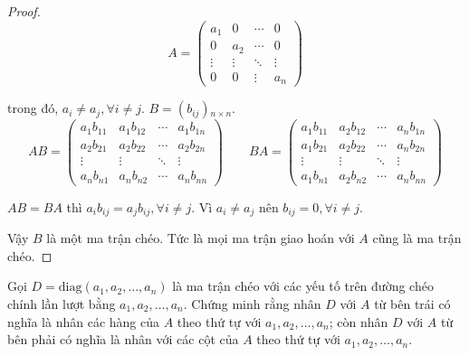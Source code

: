 \begin{proof}
    \[
        A =
        \begin{pmatrix}
            a_{1}  & 0      & \cdots & 0      \\
            0      & a_{2}  & \cdots & 0      \\
            \vdots & \vdots & \ddots & \vdots \\
            0      & 0      & \vdots & a_{n}
        \end{pmatrix}
    \]
    
    trong đó, $a_{i}\ne a_{j},\forall i\ne j$. $B = (b_{ij}){}_{n\times n}$.
    \[
        AB =
        \begin{pmatrix}
            a_{1}b_{11} & a_{1}b_{12} & \cdots & a_{1}b_{1n} \\
            a_{2}b_{21} & a_{2}b_{22} & \cdots & a_{2}b_{2n} \\
            \vdots      & \vdots      & \ddots & \vdots      \\
            a_{n}b_{n1} & a_{n}b_{n2} & \cdots & a_{n}b_{nn}
        \end{pmatrix}
        \qquad
        BA =
        \begin{pmatrix}
            a_{1}b_{11} & a_{2}b_{12} & \cdots & a_{n}b_{1n} \\
            a_{1}b_{21} & a_{2}b_{22} & \cdots & a_{n}b_{2n} \\
            \vdots      & \vdots      & \ddots & \vdots      \\
            a_{1}b_{n1} & a_{2}b_{n2} & \cdots & a_{n}b_{nn}
        \end{pmatrix}
    \]
    
    $AB = BA$ thì $a_{i}b_{ij} = a_{j}b_{ij},\forall i\ne j$. Vì $a_{i} \ne a_{j}$ nên $b_{ij} = 0,\forall i\ne j$.
    
    Vậy $B$ là một ma trận chéo. Tức là mọi ma trận giao hoán với $A$ cũng là ma trận chéo.
\end{proof}

\begin{exercise}
    Gọi $D = \text{diag}(a_{1},a_{2},\ldots,a_{n})$ là ma trận chéo với các yếu tố trên đường chéo chính lần lượt bằng $a_{1}, a_{2}, \ldots, a_{n}$. Chứng minh rằng nhân $D$ với $A$ từ bên trái có nghĩa là nhân các hàng của $A$ theo thứ tự với $a_{1}, a_{2},\ldots,a_{n}$; còn nhân $D$ với $A$ từ bên phải có nghĩa là nhân với các cột của $A$ theo thứ tự với $a_{1}, a_{2}, \ldots, a_{n}$.
\end{exercise}

